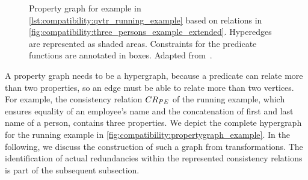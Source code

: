 \begin{figure}
    \centering
    
    
    \caption[Property graph for the running example]{Property graph for \qvtr example in \autoref{lst:compatibility:qvtr_running_example} based on relations in \autoref{fig:compatibility:three_persons_example_extended}. Hyperedges are represented as shaded areas. Constraints for the predicate functions are annotated in boxes. Adapted from~.}
    \label{fig:compatibility:propertygraph_example}
\end{figure}

A property graph needs to be a hypergraph, because a predicate can relate more than two properties, so an edge must be able to relate more than two vertices.
For example, the consistency relation $\consistencyrelation{CR}{PE}$ of the running example, which ensures equality of an employee's name and the concatenation of first and last name of a person, contains three properties.
We depict the complete hypergraph for the running example in \autoref{fig:compatibility:propertygraph_example}.
In the following, we discuss the construction of such a graph from \qvtr transformations.
The identification of actual redundancies within the represented consistency relations is part of the subsequent subsection.


